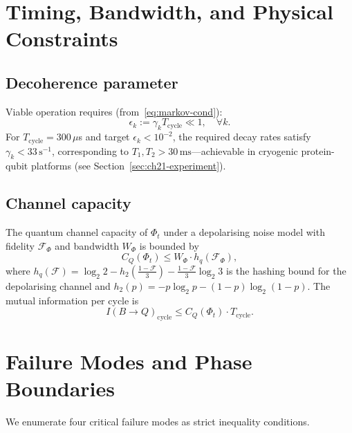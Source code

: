 \section{Timing, Bandwidth, and Physical Constraints}
\label{sec:ch21-constraints}

\subsection{Decoherence parameter}

Viable operation requires (from~\eqref{eq:markov-cond}):
\begin{equation}\label{eq:decoherence-param}
  \epsilon_k := \gamma_k T_{\mathrm{cycle}} \ll 1,
  \quad \forall k.
\end{equation}
For $T_{\mathrm{cycle}} = 300\,\mu$s and target $\epsilon_k < 10^{-2}$,
the required decay rates satisfy $\gamma_k < 33\,\text{s}^{-1}$, corresponding
to $T_1, T_2 > 30\,\text{ms}$---achievable in cryogenic protein-qubit
platforms (see Section~\ref{sec:ch21-experiment}).

\subsection{Channel capacity}

The quantum channel capacity of $\Phi_t$ under a depolarising noise
model with fidelity $\mathcal{F}_\Phi$ and bandwidth $W_\Phi$ is
bounded by
\begin{equation}\label{eq:channel-capacity}
  C_Q(\Phi_t)
  \leq W_\Phi \cdot h_q(\mathcal{F}_\Phi),
\end{equation}
where $h_q(\mathcal{F}) = \log_2 2 - h_2\!\left(\frac{1-\mathcal{F}}{3}\right)
- \frac{1-\mathcal{F}}{3}\log_2 3$ is the hashing bound for the
depolarising channel and $h_2(p) = -p\log_2 p - (1-p)\log_2(1-p)$.
The mutual information per cycle is
\begin{equation}\label{eq:mutual-info}
  I(B \to Q)_{\mathrm{cycle}}
  \leq C_Q(\Phi_t) \cdot T_{\mathrm{cycle}}.
\end{equation}

\section{Failure Modes and Phase Boundaries}
\label{sec:ch21-failure}

We enumerate four critical failure modes as strict inequality conditions.

